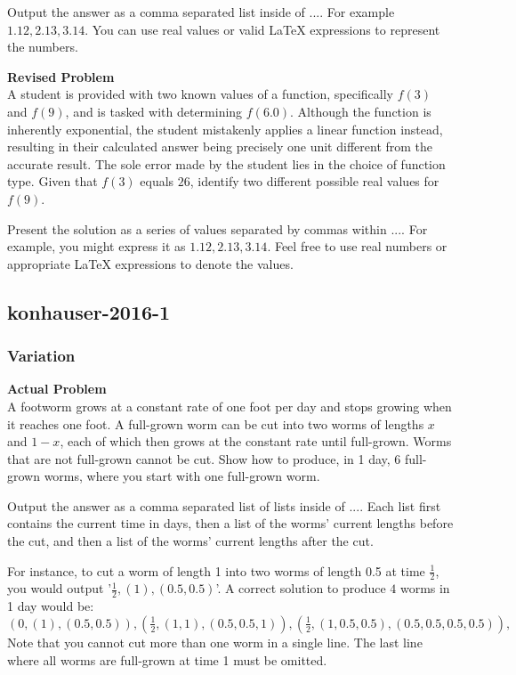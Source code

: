 Output the answer as a comma separated list inside of $\boxed{...}$. For example $\boxed{1.12, 2.13, 3.14}$. You can use real values or valid LaTeX expressions to represent the numbers.

\textbf{Revised Problem}\\
A student is provided with two known values of a function, specifically $f(3)$ and $f(9)$, and is tasked with determining $f(6.0)$. Although the function is inherently exponential, the student mistakenly applies a linear function instead, resulting in their calculated answer being precisely one unit different from the accurate result. The sole error made by the student lies in the choice of function type. Given that $f(3)$ equals $26$, identify two different possible real values for $f(9)$.

Present the solution as a series of values separated by commas within $\boxed{...}$. For example, you might express it as $\boxed{1.12, 2.13, 3.14}$. Feel free to use real numbers or appropriate LaTeX expressions to denote the values.

\subsection{konhauser-2016-1}
\subsubsection{Variation}
\textbf{Actual Problem}\\
A footworm grows at a constant rate of one foot per day and stops growing when it reaches one foot. A full-grown worm can be cut into two worms of lengths $x$ and $1-x$, each of which then grows at the constant rate until full-grown. Worms that are not full-grown cannot be cut. Show how to produce, in 1 day, 6 full-grown worms, where you start with one full-grown worm.

Output the answer as a comma separated list of lists inside of $\boxed{...}$. Each list first contains the current time in days, then a list of the worms' current lengths before the cut, and then a list of the worms' current lengths after the cut.

For instance, to cut a worm of length 1 into two worms of length 0.5 at time $\frac{1}{2}$, you would output '$\frac{1}{2}, (1), (0.5, 0.5)$'. A correct solution to produce $4$ worms in 1 day would be:
$\boxed{
    (0, (1), (0.5, 0.5)),
    (\frac{1}{2}, (1, 1), (0.5, 0.5, 1)),
    (\frac{1}{2}, (1, 0.5, 0.5), (0.5, 0.5, 0.5, 0.5)),
}$
Note that you cannot cut more than one worm in a single line. The last line where all worms are full-grown at time 1 must be omitted.

